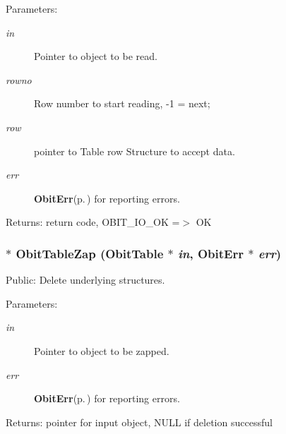 \begin{Desc}
\item[Parameters:]
\begin{description}
\item[{\em in}]Pointer to object to be read. \item[{\em rowno}]Row number to start reading, -1 = next; \item[{\em row}]pointer to Table row Structure to accept data. \item[{\em err}]{\bf Obit\-Err}{\rm (p.\,\pageref{structObitErr})} for reporting errors. \end{description}
\end{Desc}
\begin{Desc}
\item[Returns:]return code, OBIT\_\-IO\_\-OK =$>$ OK \end{Desc}
\subsubsection{$\ast$ Obit\-Table\-Zap ({\bf Obit\-Table} $\ast$ {\em in}, {\bf Obit\-Err} $\ast$ {\em err})}\label{ObitTable_8h_a34}


Public: Delete underlying structures. 

\begin{Desc}
\item[Parameters:]
\begin{description}
\item[{\em in}]Pointer to object to be zapped. \item[{\em err}]{\bf Obit\-Err}{\rm (p.\,\pageref{structObitErr})} for reporting errors. \end{description}
\end{Desc}
\begin{Desc}
\item[Returns:]pointer for input object, NULL if deletion successful \end{Desc}
